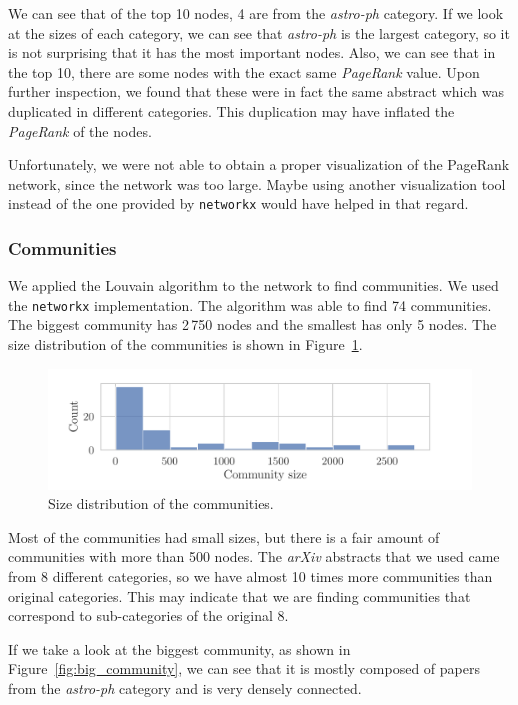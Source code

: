 We can see that of the top 10 nodes, 4 are from the \emph{astro-ph} category. If we look at the
sizes of each category, we can see that \emph{astro-ph} is the largest category, so it is not
surprising that it has the most important nodes. Also, we can see that in the top 10, there are some
nodes with the exact same \emph{PageRank} value. Upon further inspection, we found that these were in
fact the same abstract which was duplicated in different categories. This duplication may have inflated
the \emph{PageRank} of the nodes.

Unfortunately, we were not able to obtain a proper visualization of the PageRank network, since
the network was too large. Maybe using another visualization tool instead of the one provided by
\texttt{networkx} would have helped in that regard.

\pagebreak
\subsubsection{Communities}

We applied the Louvain algorithm to the network to find communities. We used the
\texttt{networkx} implementation. The algorithm was able to find
74 communities. The biggest community has 2\,750 nodes and the smallest has
only 5 nodes. The size distribution of the communities is shown in Figure~\ref{fig:communities}.

\begin{figure}[H]
	\includegraphics{figures/community_dist.pdf}
	\caption{Size distribution of the communities.}%
	\label{fig:communities}
\end{figure}

Most of the communities had small sizes, but there is a fair amount of communities with
more than 500 nodes. The \emph{arXiv} abstracts that we used came from 8 different categories,
so we have almost 10 times more communities than original categories. This may indicate
that we are finding communities that correspond to sub-categories of the original 8.

If we take a look at the biggest community, as shown in Figure~\ref{fig:big_community}, we can see
that it is mostly composed of papers from the \emph{astro-ph} category and is very
densely connected.

